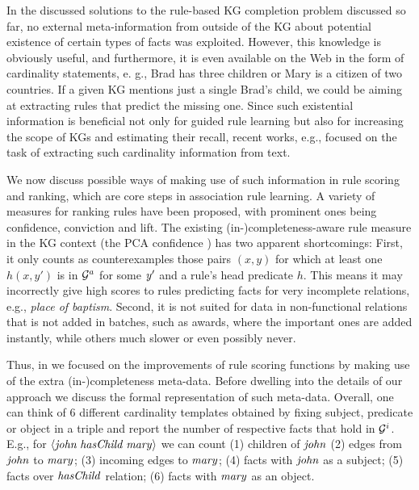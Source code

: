 In the discussed solutions to the rule-based KG completion problem discussed so far, no external meta-information
from outside of the KG about potential existence of certain types of facts was exploited.
However, this knowledge is obviously useful, and furthermore, it is even available on the Web
in the form of cardinality statements, e. g., Brad has three children or Mary is a citizen of two countries. 
If a given KG mentions just a single Brad’s child, we could be aiming at extracting rules that predict the missing
one. Since such existential information is beneficial not only for guided rule learning but
also for increasing the scope of KGs and estimating their recall, recent works, e.g., \cite{cardinality-extraction-iswc-2016} focused 
on the task of extracting such cardinality information from text.

We now discuss possible ways of making use of such information in rule scoring and ranking, which are core steps in association rule learning. A variety of measures for ranking rules have been proposed, with prominent ones being confidence, conviction and lift.  
The existing (in-)completeness-aware rule measure in the KG context (the PCA confidence \cite{amie}) 
has two apparent shortcomings: First,  
it only counts as counterexamples those %
pairs $(x,y)$ for which at least one 
$h(x,y')$ %
is in $\mathcal{G}^a$ for some $\mathit{y'}$ and a rule's head predicate $h$. This means it may incorrectly give high scores to rules predicting facts for very incomplete relations, e.g., \emph{place of baptism}. 
Second, it is not suited for data in non-functional relations that is not added in batches, such as awards, where 
the important ones are added instantly, 
while others much slower or even possibly never. 


Thus, in %
\cite{carl} we focused on the improvements of rule scoring functions by making use of the extra (in-)completeness meta-data. 
Before dwelling into the details of our approach we discuss the formal representation of such meta-data. 
Overall, one can think of 6 different cardinality templates obtained by fixing subject, predicate or object in a triple and report the number of respective facts that hold in $\mathcal{G}^i$. 
E.g., for $\mathit{\langle john\;hasChild\;mary\rangle}$ we %
can count
(1) children of $\mathit{john}$ %
(2) edges from $\mathit{john}$ to $\mathit{mary}$; %
(3) incoming edges to $\mathit{mary}$; %
(4) %
facts with $\mathit{john}$ as a subject; (5) %
facts over $\mathit{hasChild}$ relation; (6) %
facts with $\mathit{mary}$ as an object. 

